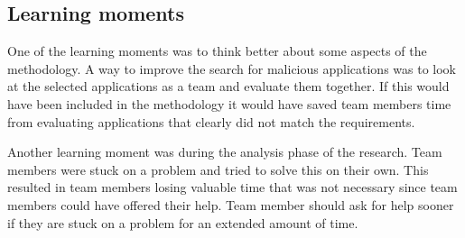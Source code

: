 \newpage
\subsection{Learning moments}
One of the learning moments was to think better about some aspects of the methodology.
A way to improve the search for malicious applications was to look at the selected applications as a team and evaluate them together.
If this would have been included in the methodology it would have saved team members time from evaluating applications that clearly did not match the requirements. 

Another learning moment was during the analysis phase of the research.
Team members were stuck on a problem and tried to solve this on their own.
This resulted in team members losing valuable time that was not necessary since team members could have offered their help.
Team member should ask for help sooner if they are stuck on a problem for an extended amount of time.